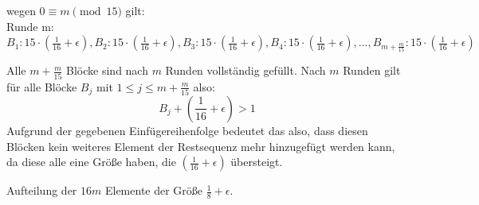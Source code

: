 \documentclass{article}
\begin{document}
wegen $0 \equiv m \pmod{15}$ gilt:\\
Runde m: $B_{1}: 15\cdot(\frac{1}{16}+\epsilon), B_{2}:15\cdot(\frac{1}{16}+\epsilon), B_{3}: 15\cdot(\frac{1}{16}+\epsilon),B_{4}: 15\cdot(\frac{1}{16}+\epsilon), ...,B_{m+\frac{m}{15}}: 15\cdot(\frac{1}{16}+\epsilon) $

Alle $m+\frac{m}{15}$ Blöcke sind nach $m$ Runden vollständig gefüllt.
Nach $m$ Runden gilt für alle Blöcke $B_{j}$ mit $1\leq j \leq m+\frac{m}{15}$ also: 
\begin{equation}
B_{j} + (\frac{1}{16}+\epsilon) > 1
\end{equation}
Aufgrund der gegebenen Einfügereihenfolge  bedeutet das also, dass diesen Blöcken kein weiteres Element der Restsequenz mehr hinzugefügt werden kann, da diese alle eine Größe haben, die $(\frac{1}{16}+\epsilon)$ übersteigt.


Aufteilung der $16m$ Elemente der Größe  $\frac{1}{8}+\epsilon$. \\
\end{document}

